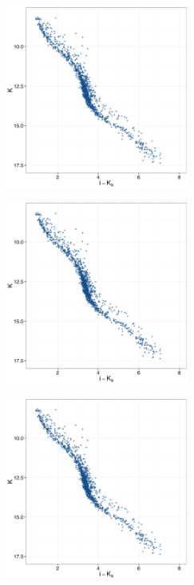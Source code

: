 \begin{figure}[ht!]
    \centering
    \begin{subfigure}[t]{0.45\textwidth}
        \includegraphics[page=2,height=6cm]{background/Figures/CIs.pdf}
        \caption{}
        \label{}
    \end{subfigure}
    \begin{subfigure}[t]{0.45\textwidth}
      \includegraphics[page=3,height=6cm]{background/Figures/CIs.pdf}
        \caption{}
        \label{} 
    \end{subfigure}
     \begin{subfigure}[t]{0.45\textwidth}
      \includegraphics[page=4,height=6cm]{background/Figures/CIs.pdf}
        \caption{}
        \label{} 
    \end{subfigure}
     \begin{subfigure}[t]{0.45\textwidth}

\end{subfigure}
\end{figure}
